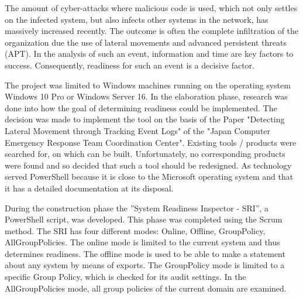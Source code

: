 
\thispagestyle{plain}
\renewcommand\section{\stdsection}
The amount of cyber-attacks where malicious code is used, which not only settles on the infected system, but also infects other systems in the network, has massively increased recently. The outcome is often the complete infiltration of the organization due the use of lateral movements and advanced persistent threats (APT). In the analysis of such an event, information and time are key factors to success. Consequently, readiness for such an event is a decisive factor.

The project was limited to Windows machines running on the operating system Windows 10 Pro or Windows Server 16. In the elaboration phase, research was done into how the goal of determining readiness could be implemented. The decision was made to implement the tool on the basis of the Paper "Detecting Lateral Movement through Tracking Event Logs" of the "Japan Computer Emergency Response Team Coordination Center". Existing tools / products were searched for, on which can be built. Unfortunately, no corresponding products were found and so decided that such a tool should be redesigned. As technology served PowerShell because it is close to the Microsoft operating system and that it has a detailed documentation at its disposal.

During the construction phase the ''System Readiness Inspector - SRI'', a PowerShell script, was developed. This phase was completed using the Scrum method. The SRI has four different modes: Online, Offline, GroupPolicy, AllGroupPolicies. The online mode is limited to the current system and thus determines readiness. The offline mode is used to be able to make a statement about any system by means of exports. The GroupPolicy mode is limited to a specific Group Policy, which is checked for its audit settings. In the AllGroupPolicies mode, all group policies of the current domain are examined. 
\thispagestyle{plain}